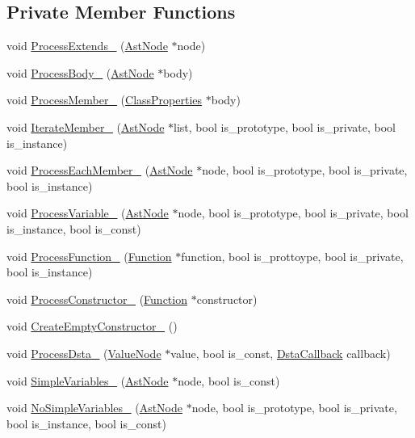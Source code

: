 \subsection*{Private Member Functions}
\begin{DoxyCompactItemize}
\item 
void \hyperlink{classmocha_1_1_class_processor_a35790bb6819b2dd44084d00cea6014e5}{ProcessExtends\_\-} (\hyperlink{classmocha_1_1_ast_node}{AstNode} $\ast$node)
\item 
void \hyperlink{classmocha_1_1_class_processor_a7dbd185d12ed689e75c48d9443dd8ef3}{ProcessBody\_\-} (\hyperlink{classmocha_1_1_ast_node}{AstNode} $\ast$body)
\item 
void \hyperlink{classmocha_1_1_class_processor_a8867933a1814c7e9434701bfd82b4e8f}{ProcessMember\_\-} (\hyperlink{classmocha_1_1_class_properties}{ClassProperties} $\ast$body)
\item 
void \hyperlink{classmocha_1_1_class_processor_a969b4c75a350c276cf1a46d51d6590c0}{IterateMember\_\-} (\hyperlink{classmocha_1_1_ast_node}{AstNode} $\ast$list, bool is\_\-prototype, bool is\_\-private, bool is\_\-instance)
\item 
void \hyperlink{classmocha_1_1_class_processor_a3249aa54768ef4f9f17c83ba011ee017}{ProcessEachMember\_\-} (\hyperlink{classmocha_1_1_ast_node}{AstNode} $\ast$node, bool is\_\-prototype, bool is\_\-private, bool is\_\-instance)
\item 
void \hyperlink{classmocha_1_1_class_processor_a40cdf4b1db8f25a96934ac25a3907a0f}{ProcessVariable\_\-} (\hyperlink{classmocha_1_1_ast_node}{AstNode} $\ast$node, bool is\_\-prototype, bool is\_\-private, bool is\_\-instance, bool is\_\-const)
\item 
void \hyperlink{classmocha_1_1_class_processor_a0aa858fe5ebd728e0e2aedda5a935223}{ProcessFunction\_\-} (\hyperlink{classmocha_1_1_function}{Function} $\ast$function, bool is\_\-prottoype, bool is\_\-private, bool is\_\-instance)
\item 
void \hyperlink{classmocha_1_1_class_processor_ab3b3b1a0e1a9005442e223292b3eb019}{ProcessConstructor\_\-} (\hyperlink{classmocha_1_1_function}{Function} $\ast$constructor)
\item 
void \hyperlink{classmocha_1_1_class_processor_a13e7dbbc74820beeb82e2a6843801b4f}{CreateEmptyConstructor\_\-} ()
\item 
void \hyperlink{classmocha_1_1_class_processor_a9e4f585d68f25b950405231dd2fb94c2}{ProcessDsta\_\-} (\hyperlink{classmocha_1_1_value_node}{ValueNode} $\ast$value, bool is\_\-const, \hyperlink{namespacemocha_ac3d8a2fe64806b144916b0b16719a540}{DstaCallback} callback)
\item 
void \hyperlink{classmocha_1_1_class_processor_a59da2ad99788e504c991b465c35462e3}{SimpleVariables\_\-} (\hyperlink{classmocha_1_1_ast_node}{AstNode} $\ast$node, bool is\_\-const)
\item 
void \hyperlink{classmocha_1_1_class_processor_a857e9b17c939e57efbb0b737cbd956dd}{NoSimpleVariables\_\-} (\hyperlink{classmocha_1_1_ast_node}{AstNode} $\ast$node, bool is\_\-prototype, bool is\_\-private, bool is\_\-instance, bool is\_\-const)
\end{DoxyCompactItemize}
